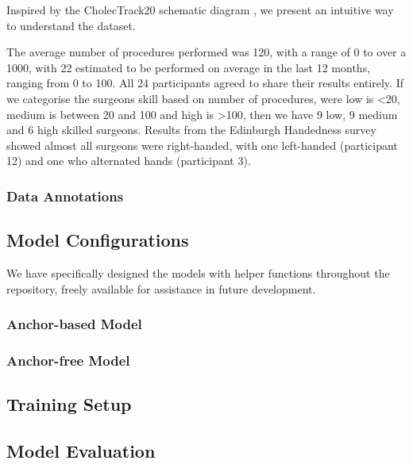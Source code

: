 Inspired by the CholecTrack20 schematic diagram \cite{nwoye_cholectrack20_2023}, we present an intuitive way to understand the dataset.

The average number of procedures performed was 120, with a range of 0 to over a 1000, with 22 estimated to be performed on average in the last 12 months, ranging from 0 to 100. All 24 participants agreed to share their results entirely. If we categorise the surgeons skill based on number of procedures, were low is <20, medium is between 20 and 100 and high is >100, then we have 9 low, 9 medium and 6 high skilled surgeons. Results from the Edinburgh Handedness survey \cite{oldfield_assessment_1971} showed almost all surgeons were right-handed, with one left-handed (participant 12) and one who alternated hands (participant 3).

\subsubsection{Data Annotations}



\subsection{Model Configurations}

We have specifically designed the models with helper functions throughout the repository, freely available for assistance in future development.

\subsubsection{Anchor-based Model}

\subsubsection{Anchor-free Model}

\subsection{Training Setup}

\subsection{Model Evaluation}


